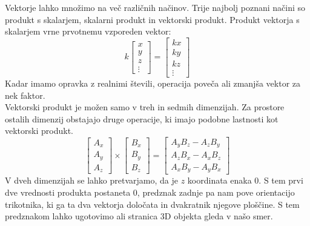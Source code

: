 \documentclass[a4paper, 12px]{article}
\begin{document}
    Vektorje lahko množimo na več različnih načinov. Trije najbolj poznani načini so produkt s skalarjem, 
    skalarni produkt in vektorski produkt. Produkt vektorja s skalarjem vrne prvotnemu vzporeden vektor:
    $$k \begin{bmatrix}
        x \\ y \\ z \\ \vdots
    \end{bmatrix} = \begin{bmatrix}
        k x \\ k y \\ k z \\ \vdots
    \end{bmatrix}$$
    Kadar imamo opravka z realnimi števili, operacija poveča ali zmanjša vektor za nek faktor. \\

    Vektorski produkt je možen samo v treh in sedmih dimenzijah. Za prostore ostalih dimenzij obstajajo
    druge operacije, ki imajo podobne lastnosti kot vektorski produkt.
    $$\begin{bmatrix}
        A_x \\ A_y \\ A_z
    \end{bmatrix} \times \begin{bmatrix}
        B_x \\ B_y \\ B_z
    \end{bmatrix} = \begin{bmatrix}
        A_y B_z - A_z B_y \\ A_z B_x - A_x B_z \\ A_x B_y - A_y B_x
    \end{bmatrix}$$
    V dveh dimenzijah se lahko pretvarjamo, da je $z$ koordinata enaka $0$. S tem prvi dve vrednosti
    produkta postaneta $0$, predznak zadnje pa nam pove orientacijo trikotnika, ki ga ta dva vektorja 
    določata in dvakratnik njegove ploščine. S tem predznakom lahko ugotovimo ali stranica 3D objekta gleda v našo smer.
    \cite{CrossProdWiki}
\end{document}
